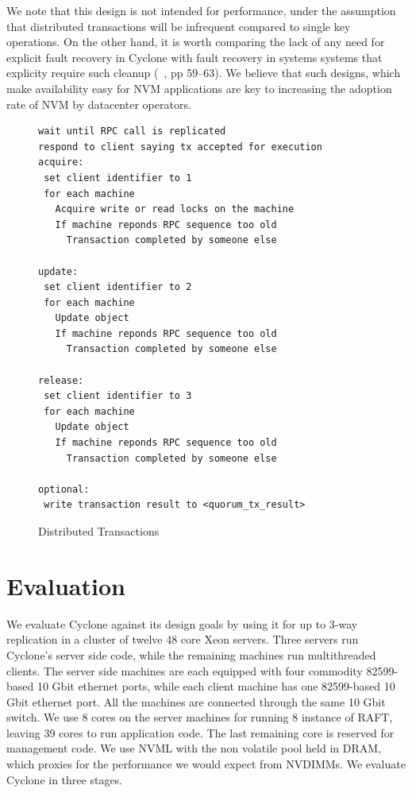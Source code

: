 \documentclass[letterpaper,twocolumn,10pt]{article}
\begin{document}
We note that this design is not intended for performance, under the assumption
that distributed transactions will be infrequent compared to single key
operations.  On the other hand, it is worth comparing the lack of any need for
explicit fault recovery in Cyclone with fault recovery in systems systems that
explicity require such cleanup (~\cite{farm}, pp 59--63).  We believe that
such designs, which make availability easy for NVM applications are key to
increasing the adoption rate of NVM by datacenter operators.

\begin{figure}
{ \scriptsize
\begin{verbatim}
wait until RPC call is replicated
respond to client saying tx accepted for execution
acquire:
 set client identifier to 1
 for each machine
   Acquire write or read locks on the machine
   If machine reponds RPC sequence too old
     Transaction completed by someone else

update:
 set client identifier to 2
 for each machine
   Update object
   If machine reponds RPC sequence too old
     Transaction completed by someone else
 
release:
 set client identifier to 3
 for each machine
   Update object
   If machine reponds RPC sequence too old
     Transaction completed by someone else

optional:
 write transaction result to <quorum_tx_result>
\end{verbatim}
}
\caption{Distributed Transactions}
\label{fig:dist_tx}
\end{figure}

\section{Evaluation}
We evaluate Cyclone against its design goals by using it for up to 3-way
replication in a cluster of twelve 48 core Xeon servers. Three servers run
Cyclone's server side code, while the remaining machines run multithreaded
clients. The server side machines are each
equipped with four commodity 82599-based 10 Gbit ethernet ports, while each
client machine has one 82599-based 10 Gbit ethernet port. All the machines are
connected through the same 10 Gbit switch. We use 8 cores on the
server machines for running 8 instance of RAFT, leaving 39 cores to run
application code. The last remaining core is reserved for management code. We
use NVML with the non volatile pool held in DRAM, which proxies for the
performance we would expect from NVDIMMs. We evaluate Cyclone in three stages.
\end{document}
